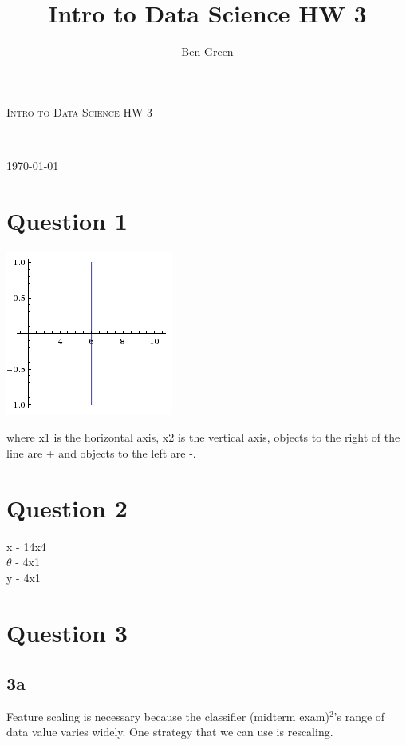 \documentclass{article}
\author{Ben Green}
\title{Intro to Data Science HW 3}
\begin{document}
\begin{titlepage}
	\begin{center}
	\textsc{\LARGE Intro to Data Science HW 3}\\
	\vspace{3mm}
	
	{\large \theauthor}\\
	
	\tableofcontents
	\setcounter{secnumdepth}{0}
	\vfill
	
	{\large \today}
	\end{center}

\end{titlepage}

\section{Question 1}

\begin{center}
\includegraphics{q1.png}
\end{center}

where x1 is the horizontal axis, x2 is the vertical axis, objects to the right of the line are + and objects to the left are -.

\section{Question 2}
x - 14x4\\
$\theta$ - 4x1\\
y - 4x1

\section{Question 3}

\subsection{3a}
Feature scaling is necessary because the classifier (midterm exam)$^2$'s range of data value varies widely. One strategy that we can use is rescaling.
\end{document}
